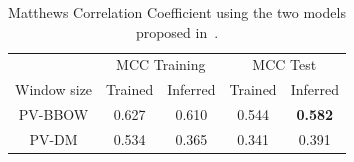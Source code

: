 \begin{table}[h]
  \begin{center}
    \begin{tabular}{ c | *2c | *2c }
      \toprule
       & \multicolumn{2}{c|}{MCC Training} & \multicolumn{2}{|c}{MCC Test}\\
      Window size & Trained & Inferred & Trained & Inferred \\
      \midrule
      PV-BBOW & 0.627 & 0.610 & 0.544 & \textbf{0.582} \\
      PV-DM   & 0.534 & 0.365 & 0.341 & 0.391 \\
    \bottomrule
    \end{tabular}
    \caption{Matthews Correlation Coefficient using the two models proposed in~\cite{Le:2014aa}.}
\label{tab:Paragraph Vector Parameter Results PV-DBOW versus PM-DV}
\end{center}
\end{table}


